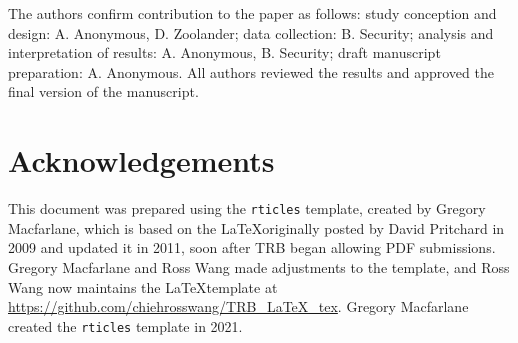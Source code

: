 \documentclass[numbered]{trbunofficial}
\begin{document}
The authors confirm contribution to the paper as follows: study
conception and design: A. Anonymous, D. Zoolander; data collection: B.
Security; analysis and interpretation of results: A. Anonymous, B.
Security; draft manuscript preparation: A. Anonymous. All authors
reviewed the results and approved the final version of the manuscript.

\hypertarget{acknowledgements}{%
\section{Acknowledgements}\label{acknowledgements}}

This document was prepared using the \texttt{rticles} template, created
by Gregory Macfarlane, which is based on the \LaTeX originally posted by
David Pritchard in 2009 and updated it in 2011, soon after TRB began
allowing PDF submissions. Gregory Macfarlane and Ross Wang made
adjustments to the template, and Ross Wang now maintains the
\LaTeX template at \url{https://github.com/chiehrosswang/TRB_LaTeX_tex}.
Gregory Macfarlane created the \texttt{rticles} template in 2021.

\newpage
\renewcommand\refname{References}

\end{document}
